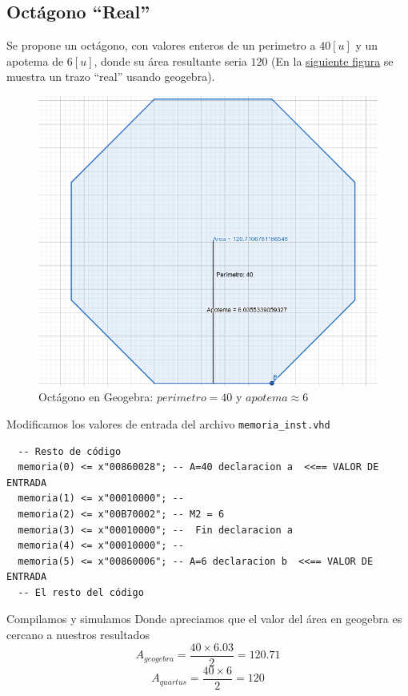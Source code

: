 \documentclass{IEEEtran}
\begin{document}
\subsection{Octágono ``Real''}
\label{sec:org0cac50d}
Se propone un octágono, con valores enteros de un perimetro a \(40[u]\) y un apotema de \(6[u]\),  donde su área resultante seria \(120\) (En la \hyperref[fig:geo51x7]{siguiente figura} se muestra un trazo ``real'' usando geogebra).
\begin{figure}[htbp]
\centering
\includegraphics[width=.9\linewidth]{./img/geo40x6.png}
\caption{\label{fig:geo51x7}Octágono en Geogebra: \(perimetro = 40\) y \(apotema \approx 6\)}
\end{figure}
Modificamos los valores de entrada del archivo \texttt{memoria\_inst.vhd}
\begin{verbatim}
  -- Resto de código
  memoria(0) <= x"00860028"; -- A=40 declaracion a  <<== VALOR DE ENTRADA
  memoria(1) <= x"00010000"; --
  memoria(2) <= x"00B70002"; -- M2 = 6
  memoria(3) <= x"00010000"; --  Fin declaracion a
  memoria(4) <= x"00010000"; --
  memoria(5) <= x"00860006"; -- A=6 declaracion b  <<== VALOR DE ENTRADA
  -- El resto del código
\end{verbatim}
Compilamos y simulamos
Donde apreciamos que el valor del área en geogebra es cercano a nuestros resultados
\[ A_{geogebra} = \frac{40 \times 6.03}{2} = 120.71 \]
\[ A_{quartus} = \frac{40 \times 6}{2} = 120 \]
\end{document}
